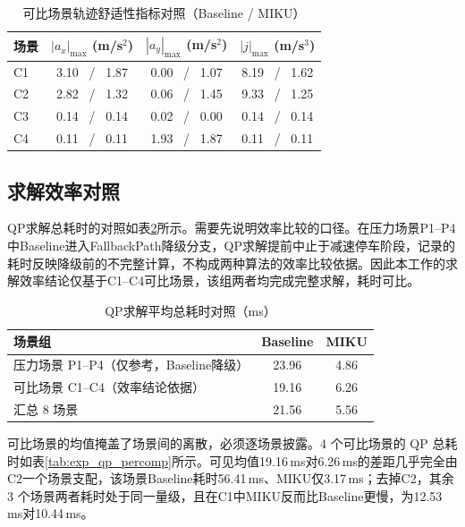 \documentclass[a4paper,11pt]{ctexart}
\theoremstyle{definition}
\begin{document}
\begin{table}[htbp]
\centering
\caption{可比场景轨迹舒适性指标对照（Baseline / MIKU）}
\label{tab:exp_comfort}
\small
\begin{tabular}{lccc}
\toprule
\textbf{场景} & \textbf{$|a_x|_{\max}$ (m/s$^2$)} & \textbf{$|a_y|_{\max}$ (m/s$^2$)} & \textbf{$|j|_{\max}$ (m/s$^3$)} \\
\midrule
C1 & 3.10 \ / \ 1.87 & 0.00 \ / \ 1.07 & 8.19 \ / \ 1.62 \\
C2 & 2.82 \ / \ 1.32 & 0.06 \ / \ 1.45 & 9.33 \ / \ 1.25 \\
C3 & 0.14 \ / \ 0.14 & 0.02 \ / \ 0.00 & 0.14 \ / \ 0.14 \\
C4 & 0.11 \ / \ 0.11 & 1.93 \ / \ 1.87 & 0.11 \ / \ 0.11 \\
\bottomrule
\end{tabular}
\end{table}

\subsection{求解效率对照}
\label{subsec:exp_qp}

QP求解总耗时的对照如表\ref{tab:exp_qp}所示。需要先说明效率比较的口径。在压力场景P1--P4中Baseline进入FallbackPath降级分支，QP求解提前中止于减速停车阶段，记录的耗时反映降级前的不完整计算，不构成两种算法的效率比较依据。因此本工作的求解效率结论仅基于C1--C4可比场景，该组两者均完成完整求解，耗时可比。

\begin{table}[htbp]
\centering
\caption{QP求解平均总耗时对照（ms）}
\label{tab:exp_qp}
\small
\begin{tabular}{lcc}
\toprule
\textbf{场景组} & \textbf{Baseline} & \textbf{MIKU} \\
\midrule
压力场景 P1--P4（仅参考，Baseline降级） & 23.96 & 4.86 \\
可比场景 C1--C4（效率结论依据） & 19.16 & 6.26 \\
\midrule
汇总 8 场景 & 21.56 & 5.56 \\
\bottomrule
\end{tabular}
\end{table}

可比场景的均值掩盖了场景间的离散，必须逐场景披露。4 个可比场景的 QP 总耗时如表\ref{tab:exp_qp_percomp}所示。可见均值19.16\,ms对6.26\,ms的差距几乎完全由C2一个场景支配，该场景Baseline耗时56.41\,ms、MIKU仅3.17\,ms；去掉C2，其余 3 个场景两者耗时处于同一量级，且在C1中MIKU反而比Baseline更慢，为12.53\,ms对10.44\,ms。
\end{document}
